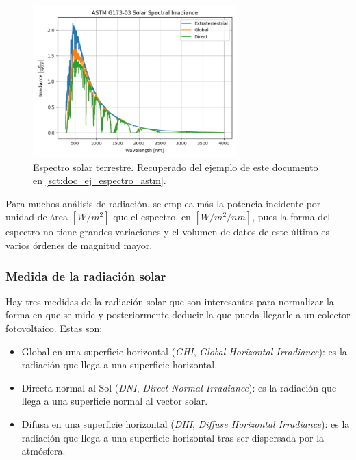 \begin{figure}[H]
      \centering
      \includegraphics[width=0.7\textwidth]{./images/SoA_irrad/astm_g173-03.png}
      \caption{Espectro solar terrestre. Recuperado del ejemplo de este documento en \ref{sct:doc_ej_espectro_astm}.}
      \label{fig:solar_spectrum}
\end{figure}

Para muchos análisis de radiación, se emplea más la potencia incidente por unidad de área $[W/m^2]$ que el espectro, en $[W/m^2/nm]$, pues la forma del espectro no tiene grandes variaciones y el volumen de datos de este último es varios órdenes de magnitud mayor.

\subsubsection{Medida de la radiación solar}

Hay tres medidas de la radiación solar que son interesantes para normalizar la forma en que se mide y posteriormente deducir la que pueda llegarle a un colector fotovoltaico. Estas son:

\begin{itemize}
      \item Global en una superficie horizontal (\textit{\gls{GHI}}, \textit{Global Horizontal Irradiance}): es la radiación que llega a una superficie horizontal.
      \item Directa normal al Sol (\textit{\gls{DNI}}, \textit{Direct Normal Irradiance}): es la radiación que llega a una superficie normal al vector solar.
      \item Difusa en una superficie horizontal (\textit{\gls{DHI}}, \textit{Diffuse Horizontal Irradiance}): es la radiación que llega a una superficie horizontal tras ser dispersada por la atmósfera.
\end{itemize}

